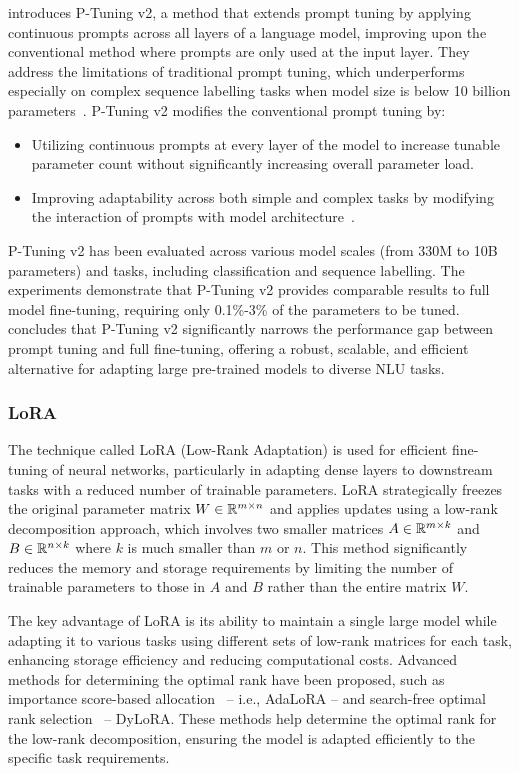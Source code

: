 \textcite{liu2022ptuning} introduces P-Tuning v2, a method that extends prompt tuning by applying continuous prompts across all layers of a language model, improving upon the conventional method where prompts are only used at the input layer.
They address the limitations of traditional prompt tuning, which underperforms especially on complex sequence labelling tasks when model size is below 10 billion parameters~\cite{lester2021power}.
P-Tuning v2 modifies the conventional prompt tuning by:
\begin{itemize}
	\item Utilizing continuous prompts at every layer of the model to increase tunable parameter count without significantly increasing overall parameter load.
	\item Improving adaptability across both simple and complex tasks by modifying the interaction of prompts with model architecture~\cite{li2021prefixtuning, qin2021learning}.
\end{itemize}
P-Tuning v2 has been evaluated across various model scales (from 330M to 10B parameters) and tasks, including classification and sequence labelling.
The experiments demonstrate that P-Tuning v2 provides comparable results to full model fine-tuning, requiring only 0.1\%-3\% of the parameters to be tuned.
\textcite{liu2022ptuning} concludes that P-Tuning v2 significantly narrows the performance gap between prompt tuning and full fine-tuning, offering a robust, scalable, and efficient alternative for adapting large pre-trained models to diverse NLU tasks.

\subsubsection{LoRA}
\label{subsubsec:lora}

The technique called LoRA (Low-Rank Adaptation) is used for efficient fine-tuning of neural networks, particularly in adapting dense layers to downstream tasks with a reduced number of trainable parameters.
LoRA strategically freezes the original parameter matrix $W \in \mathbb{R}^{m \times n}$ and applies updates using a low-rank decomposition approach, which involves two smaller matrices $A \in \mathbb{R}^{m \times k}$ and $B \in \mathbb{R}^{n \times k}$ where $k$ is much smaller than $m$ or $n$.
This method significantly reduces the memory and storage requirements by limiting the number of trainable parameters to those in $A$ and $B$ rather than the entire matrix $W$.

The key advantage of LoRA is its ability to maintain a single large model while adapting it to various tasks using different sets of low-rank matrices for each task, enhancing storage efficiency and reducing computational costs.
Advanced methods for determining the optimal rank have been proposed, such as importance score-based allocation~\cite{zhang2023adalora} -- i.e., AdaLoRA -- and search-free optimal rank selection~\cite{valipour2023dylora} -- DyLoRA\@.
These methods help determine the optimal rank for the low-rank decomposition, ensuring the model is adapted efficiently to the specific task requirements.

